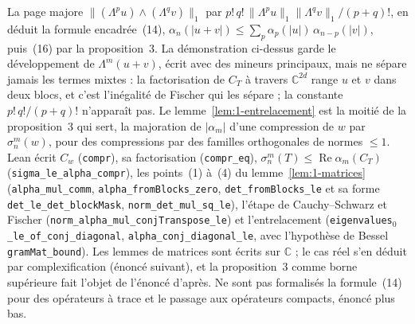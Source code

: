 \begin{remarque}
La page majore $\|(\Lambda^p u) \wedge (\Lambda^q v)\|_1$ par $p!\,q!\,\|\Lambda^p u\|_1\|\Lambda^q v\|_1/(p+q)!$, en déduit la formule encadrée~(14), $\alpha_n(|u+v|) \leq \sum_p \alpha_p(|u|)\,\alpha_{n-p}(|v|)$, puis~(16) par la proposition~3. La démonstration ci-dessus garde le développement de $\Lambda^m(u+v)$, écrit avec des mineurs principaux, mais ne sépare jamais les termes mixtes : la factorisation de $C_T$ à travers $\mathbb C^{2d}$ range $u$ et $v$ dans deux blocs, et c'est l'inégalité de Fischer qui les sépare ; la constante $p!\,q!/(p+q)!$ n'apparaît pas. Le lemme~\ref{lem:1-entrelacement} est la moitié de la proposition~3 qui sert, la majoration de $|\alpha_m|$ d'une compression de $w$ par $\sigma_n^m(w)$, pour des compressions par des familles orthogonales de normes $\leq 1$. Lean écrit $C_w$ (\texttt{compr}), sa factorisation (\texttt{compr\_eq}), $\sigma_n^m(T) \leq \operatorname{Re} \alpha_m(C_T)$ (\texttt{sigma\_le\_alpha\_compr}), les points~(1) à~(4) du lemme~\ref{lem:1-matrices} (\texttt{alpha\_mul\_comm}, \texttt{alpha\_fromBlocks\_zero}, \texttt{det\_fromBlocks\_le} et sa forme \texttt{det\_le\_det\_blockMask}, \texttt{norm\_det\_mul\_sq\_le}), l'étape de Cauchy--Schwarz et Fischer (\texttt{norm\_alpha\_mul\_conjTranspose\_le}) et l'entrelacement (\texttt{eigenvalues}$_0$\texttt{\_le\_of\_conj\_diagonal}, \texttt{alpha\_conj\_diagonal\_le}, avec l'hypothèse de Bessel \texttt{gramMat\_bound}). Les lemmes de matrices sont écrits sur $\mathbb C$ ; le cas réel s'en déduit par complexification (énoncé suivant), et la proposition~3 comme borne supérieure fait l'objet de l'énoncé d'après. Ne sont pas formalisés la formule~(14) pour des opérateurs à trace et le passage aux opérateurs compacts, énoncé plus bas.
\end{remarque}


